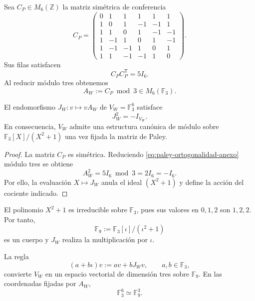 Sea \(C_P\in M_6(\mathbb Z)\) la matriz simétrica de conferencia
\begin{equation}
 C_P=
 \begin{pmatrix}
 0& 1& 1& 1& 1& 1\\
 1& 0& 1&-1&-1& 1\\
 1& 1& 0& 1&-1&-1\\
 1&-1& 1& 0& 1&-1\\
 1&-1&-1& 1& 0& 1\\
 1& 1&-1&-1& 1& 0
 \end{pmatrix}.
 \label{eq:paley-conferencia-anexo}
\end{equation}
Sus filas satisfacen
\begin{equation}
 C_P C_P^{\mathsf T}=5I_6.
 \label{eq:paley-ortogonalidad-anexo}
\end{equation}
Al reducir módulo tres obtenemos
\begin{equation}
 A_W:=C_P\bmod 3\in M_6(\mathbb F_3).
 \label{eq:paley-reduccion-anexo}
\end{equation}

\begin{theorem}
\label{thm:raiz-interna-menos-uno-anexo}
El endomorfismo \(J_W:v\mapsto vA_W\) de
\(V_W=\mathbb F_3^6\) satisface
\begin{equation}
 J_W^2=-I_{V_W}.
 \label{eq:Jw-cuadrado-anexo}
\end{equation}
En consecuencia, \(V_W\) admite una estructura canónica de módulo sobre
\(\mathbb F_3[X]/(X^2+1)\) una vez fijada la matriz de Paley.
\end{theorem}

\begin{proof}
La matriz \(C_P\) es simétrica. Reduciendo
\eqref{eq:paley-ortogonalidad-anexo} módulo tres se obtiene
\[
 A_W^2=5I_6\bmod3=2I_6=-I_6.
\]
Por ello, la evaluación \(X\mapsto J_W\) anula el ideal
\((X^2+1)\) y define la acción del cociente indicado.
\end{proof}

El polinomio \(X^2+1\) es irreducible sobre \(\mathbb F_3\), pues sus
valores en \(0,1,2\) son \(1,2,2\). Por tanto,
\begin{equation}
 \mathbb F_9:=\mathbb F_3[\iota]/(\iota^2+1)
 \label{eq:F9-desde-paley-anexo}
\end{equation}
es un cuerpo y \(J_W\) realiza la multiplicación por \(\iota\).

\begin{corollary}
\label{cor:F3seis-F9tres-anexo}
La regla
\begin{equation}
 (a+b\iota)v:=av+bJ_Wv,
 \qquad a,b\in\mathbb F_3,
 \label{eq:accion-F9-anexo}
\end{equation}
convierte \(V_W\) en un espacio vectorial de dimensión tres sobre
\(\mathbb F_9\). En las coordenadas fijadas por \(A_W\),
\begin{equation}
 \mathbb F_3^6\simeq\mathbb F_9^3.
 \label{eq:F3seis-igual-F9tres-anexo}
\end{equation}
\end{corollary}

